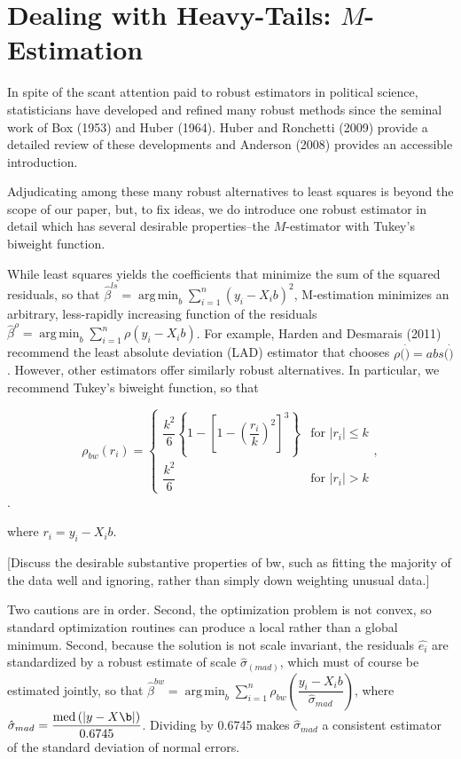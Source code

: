 \documentclass[12pt]{article}
\DeclareMathOperator*{\argmin}{arg\,min}
\DeclareMathOperator{\med}{med}
\begin{document}
\section*{Dealing with Heavy-Tails: $M$-Estimation}

In spite of the scant attention paid to robust estimators in political science, statisticians have developed and refined many robust methods since the seminal work of Box (1953) and Huber (1964). Huber and Ronchetti (2009) provide a detailed review of these developments and Anderson (2008) provides an accessible introduction. 

Adjudicating among these many robust alternatives to least squares is beyond the scope of our paper, but, to fix ideas, we do introduce one robust estimator in detail which has several desirable properties--the $M$-estimator with Tukey's biweight function. 

While least squares yields the coefficients that minimize the sum of the squared residuals, so that $\hat{\beta}^{ls} =\argmin_{b} \sum_{i = 1}^n (y_i - X_ib)^2$, M-estimation minimizes an arbitrary, less-rapidly increasing function of the residuals $\hat{\beta}^{\rho} =\argmin_{b} \sum_{i = 1}^n \rho(y_i - X_ib)$. For example, Harden and Desmarais (2011) recommend the least absolute deviation (LAD) estimator that chooses $\rho(\dot) = abs(\dot)$. However, other estimators offer similarly robust alternatives. In particular, we recommend Tukey's biweight function, so that

\begin{displaymath}
   \rho_{bw}(r_i) = \left\{
     \begin{array}{lr}
       \dfrac{k^2}{6}\left\{ 1 - \left[ 1 - \left( \dfrac{r_i}{k} \right)^2 \right]^3\right\} & \text{for } |r_i| \leq k\\
	\dfrac{k^2}{6} & \text{for } |r_i| > k 
\end{array}
   \right.,
\end{displaymath}.

where $r_i = y_i - X_ib$.

[Discuss the desirable substantive properties of bw, such as fitting the majority of the data well and ignoring, rather than simply down weighting unusual data.]

Two cautions are in order. Second, the optimization problem is not convex, so standard optimization routines can produce a local rather than a global minimum. Second, because the solution is not scale invariant, the residuals $\hat{e_i}$ are standardized by a robust estimate of scale $\hat{\sigma}_{(mad)}$, which must of course be estimated jointly, so that $\hat{\beta}^{bw} =\argmin_{b} \sum_{i = 1}^n \rho_{bw}\left(\dfrac{y_i - X_ib}{\hat{\sigma}_{mad}}\right)$, where $\hat{\sigma}_{mad} = \dfrac{\med\left( |y - X\b|\right)}{0.6745}$. Dividing by 0.6745 makes $\hat{\sigma}_{mad}$ a consistent estimator of the standard deviation of normal errors.
\end{document}
